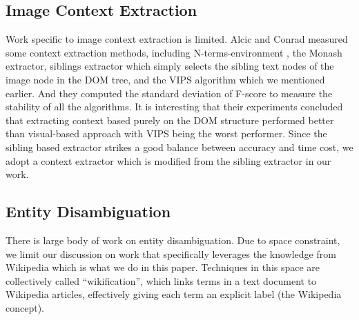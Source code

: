 

\subsection{Image Context Extraction}

Work specific to image context extraction is limited.
Alcic and Conrad \cite{Alcic2010} measured some context extraction methods, including
N-terms-environment \cite{Coelho2004}, the Monash extractor\cite{Fauzi2009},
siblings extractor which simply selects the sibling text nodes of the image node
in the DOM tree, and the VIPS \cite{VIPS} algorithm which we mentioned earlier.
And they computed the standard deviation of F-score to measure the stability
of all the algorithms.
It is interesting that their experiments concluded that extracting context
based purely on the DOM structure performed better than
visual-based approach with VIPS being the worst performer.
Since the sibling based extractor strikes a good
balance between accuracy and time cost, we adopt a context extractor
which is modified from the sibling extractor in our work.

\subsection{Entity Disambiguation}
\label{wikification}

There is large body of work on entity disambiguation. Due to space constraint,
we limit our discussion on work that specifically leverages the knowledge from
Wikipedia which is what we do in this paper.
Techniques in this space are collectively called ``wikification'', which links
terms in a text document to Wikipedia articles, effectively giving each term
an explicit label (the Wikipedia concept).

